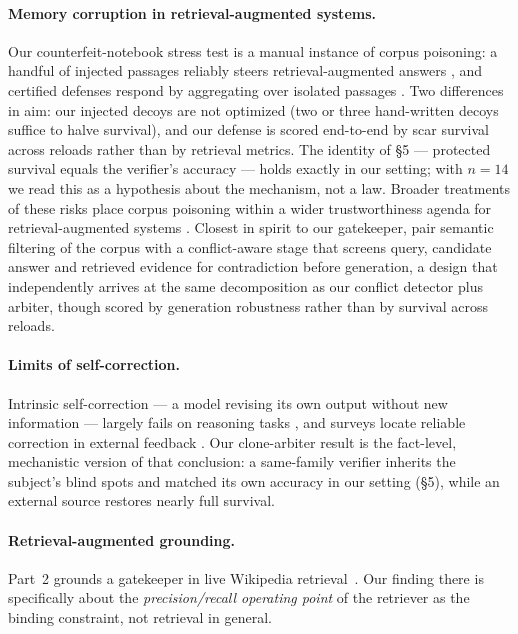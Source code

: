 \documentclass[11pt]{article}
\begin{document}
\paragraph{Memory corruption in retrieval-augmented systems.}
Our counterfeit-notebook stress test is a manual instance of corpus poisoning:
a handful of injected passages reliably steers retrieval-augmented answers
\citep{zhong2023poisoning, zou2024poisonedrag}, and certified defenses respond
by aggregating over isolated passages \citep{xiang2024certifiably}. Two
differences in aim: our injected decoys are not optimized (two or three
hand-written decoys suffice to halve survival), and our defense is scored end-to-end by
scar survival across reloads rather than by retrieval metrics. The identity of
\S5 --- protected survival equals the verifier's accuracy --- holds exactly
in our setting; with $n=14$ we read this as a hypothesis about the mechanism,
not a law.
Broader treatments of these risks place corpus poisoning within a wider
trustworthiness agenda for retrieval-augmented systems
\citep{ni2025trustworthy}.
Closest in spirit to our gatekeeper, \citet{si2025secon} pair semantic filtering
of the corpus with a conflict-aware stage that screens query, candidate answer
and retrieved evidence for contradiction before generation, a design that
independently arrives at the same decomposition as our conflict detector plus
arbiter, though scored by generation robustness rather than by survival across
reloads.

\paragraph{Limits of self-correction.}
Intrinsic self-correction --- a model revising its own output without new
information --- largely fails on reasoning tasks \citep{huang2024cannot}, and
surveys locate reliable correction in external feedback
\citep{pan2024automatically, kamoi2024when}. Our clone-arbiter result is the
fact-level, mechanistic version of that conclusion: a same-family verifier
inherits the subject's blind spots and matched its own accuracy in our setting
(\S5), while an external source restores nearly full survival.

\paragraph{Retrieval-augmented grounding.} Part~2 grounds a gatekeeper in live
Wikipedia retrieval~\cite{rag}.
Our finding there is specifically about the \emph{precision/recall operating
point} of the retriever as the binding constraint, not retrieval in general.
\end{document}
